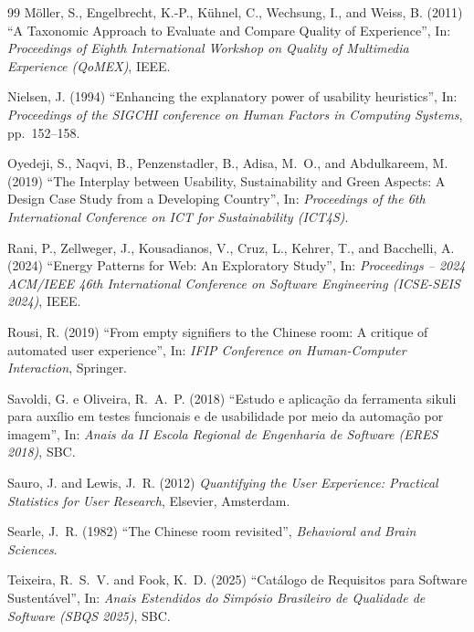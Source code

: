 \documentclass[12pt]{article}
\begin{document}
\begin{thebibliography}{99}
Möller, S., Engelbrecht, K.-P., Kühnel, C., Wechsung, I., and Weiss, B. (2011)
``A Taxonomic Approach to Evaluate and Compare Quality of Experience'', In:
\textit{Proceedings of Eighth International Workshop on Quality of Multimedia
Experience (QoMEX)}, IEEE.

Nielsen, J. (1994) ``Enhancing the explanatory power of usability heuristics'',
In: \textit{Proceedings of the SIGCHI conference on Human Factors in Computing
Systems}, pp.~152--158.

Oyedeji, S., Naqvi, B., Penzenstadler, B., Adisa, M.~O., and Abdulkareem,
M. (2019) ``The Interplay between Usability, Sustainability and Green Aspects:
A Design Case Study from a Developing Country'', In: \textit{Proceedings of
the 6th International Conference on ICT for Sustainability (ICT4S)}.

Rani, P., Zellweger, J., Kousadianos, V., Cruz, L., Kehrer, T., and
Bacchelli, A. (2024) ``Energy Patterns for Web: An Exploratory Study'', In:
\textit{Proceedings -- 2024 ACM/IEEE 46th International Conference on Software
Engineering (ICSE-SEIS 2024)}, IEEE.

Rousi, R. (2019) ``From empty signifiers to the Chinese room: A critique of
automated user experience'', In: \textit{IFIP Conference on Human-Computer
Interaction}, Springer.

Savoldi, G. e Oliveira, R.~A.~P. (2018) ``Estudo e aplicação da ferramenta
sikuli para auxílio em testes funcionais e de usabilidade por meio da
automação por imagem'', In: \textit{Anais da II Escola Regional de Engenharia
de Software (ERES 2018)}, SBC.

Sauro, J. and Lewis, J.~R. (2012) \textit{Quantifying the User Experience:
Practical Statistics for User Research}, Elsevier, Amsterdam.

Searle, J.~R. (1982) ``The Chinese room revisited'',
\textit{Behavioral and Brain Sciences}.

Teixeira, R.~S.~V. and Fook, K.~D. (2025) ``Catálogo de Requisitos para
Software Sustentável'', In: \textit{Anais Estendidos do Simpósio Brasileiro de
Qualidade de Software (SBQS 2025)}, SBC.

\end{thebibliography}
\end{document}
